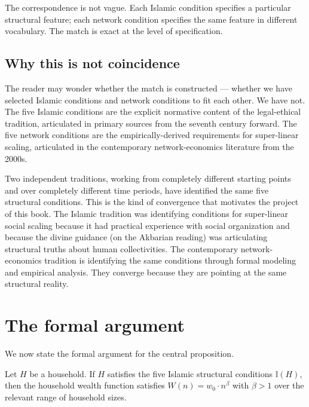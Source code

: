 The correspondence is not vague. Each Islamic condition specifies a
particular structural feature; each network condition specifies the
same feature in different vocabulary. The match is exact at the
level of specification.

\subsection{Why this is not coincidence}

The reader may wonder whether the match is constructed --- whether
we have selected Islamic conditions and network conditions to fit
each other. We have not. The five Islamic conditions are the
explicit normative content of the legal-ethical tradition,
articulated in primary sources from the seventh century forward.
The five network conditions are the empirically-derived requirements
for super-linear scaling, articulated in the contemporary
network-economics literature from the 2000s.

Two independent traditions, working from completely different
starting points and over completely different time periods, have
identified the same five structural conditions. This is the kind of
convergence that motivates the project of this book. The Islamic
tradition was identifying conditions for super-linear social
scaling because it had practical experience with social
organization and because the divine guidance (on the Akbarian
reading) was articulating structural truths about human
collectivities. The contemporary network-economics tradition is
identifying the same conditions through formal modeling and
empirical analysis. They converge because they are pointing at the
same structural reality.

\section{The formal argument}
\label{sec:network-formal-proof}

We now state the formal argument for the central proposition.

\begin{theorem}
\label{thm:islamic-superlinear}
Let $H$ be a household. If $H$ satisfies the five Islamic
structural conditions $\mathbb{I}(H)$, then the household wealth
function satisfies $W(n) = w_0 \cdot n^\beta$ with $\beta > 1$ over
the relevant range of household sizes.
\end{theorem}

